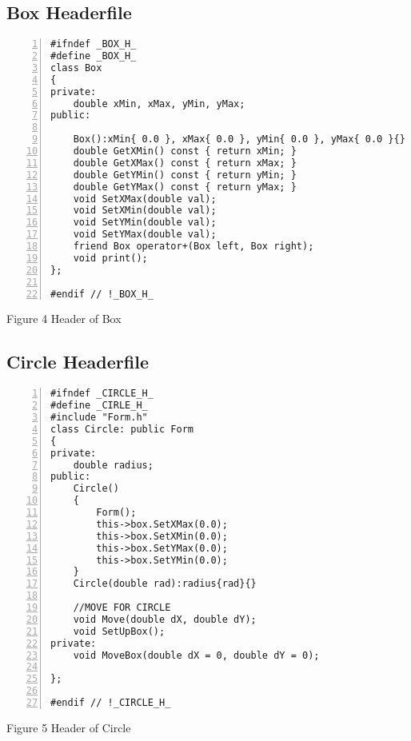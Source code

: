 \documentclass{llncs}
\begin{document}
\subsection{Box Headerfile}

\begin{lstlisting}[basicstyle=\footnotesize\ttfamily, numbers=left, stepnumber=1, numberstyle = \normalsize]
#ifndef _BOX_H_
#define _BOX_H_
class Box
{
private:
	double xMin, xMax, yMin, yMax;
public:
	
	Box():xMin{ 0.0 }, xMax{ 0.0 }, yMin{ 0.0 }, yMax{ 0.0 }{}
	double GetXMin() const { return xMin; }
	double GetXMax() const { return xMax; }
	double GetYMin() const { return yMin; }
	double GetYMax() const { return yMax; }
	void SetXMax(double val);
	void SetXMin(double val);
	void SetYMin(double val);
	void SetYMax(double val);
	friend Box operator+(Box left, Box right);
	void print(); 
};

#endif // !_BOX_H_
\end{lstlisting}
\footnotesize{Figure 4 Header of Box}
\subsection{Circle Headerfile}
\begin{lstlisting}[basicstyle=\footnotesize\ttfamily, numbers=left, stepnumber=1, numberstyle = \normalsize]
#ifndef _CIRCLE_H_
#define _CIRLE_H_
#include "Form.h"
class Circle: public Form
{
private: 
	double radius; 
public:
	Circle() 
	{
		Form();
		this->box.SetXMax(0.0);
		this->box.SetXMin(0.0);
		this->box.SetYMax(0.0);
		this->box.SetYMin(0.0);
	}
	Circle(double rad):radius{rad}{}

	//MOVE FOR CIRCLE
	void Move(double dX, double dY);
	void SetUpBox();
private:
	void MoveBox(double dX = 0, double dY = 0);
	
};

#endif // !_CIRCLE_H_
\end{lstlisting}
\footnotesize{Figure 5 Header of Circle}
\end{document}

